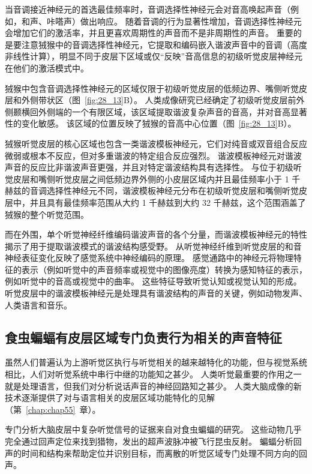 当音调接近神经元的首选最佳频率时，音调选择性神经元会对音高唤起声音（例如，和声、咔嗒声）做出响应。
随着音调的行为显著性增加，音调选择性神经元会增加它们的激活率，并且更喜欢周期性的声音而不是非周期性的声音。
重要的是要注意狨猴中的音调选择性神经元，它提取和编码嵌入谐波声音中的音调（高度非线性计算），明显不同于皮层下区域或仅“反映”音高信息的初级听觉皮层神经元在他们的激活模式中。


狨猴中包含音调选择性神经元的区域仅限于初级听觉皮层的低频边界、嘴侧听觉皮层和外侧带状区（图~\ref{fig:28_13}B）。
人类成像研究已经确定了初级听觉皮层前外侧颞横回外侧端的一个有限区域，该区域提取谐波复杂声音的音高，并对音高显著性的变化敏感。
该区域的位置反映了狨猴的音高中心位置（图~\ref{fig:28_13}B）。


狨猴听觉皮层的核心区域也包含一类谐波模板神经元，它们对纯音或双音组合反应微弱或根本不反应，但对多重谐波的特定组合反应强烈。
谐波模板神经元对谐波声音的反应比非谐波声音更强，并且对特定谐波结构具有选择性。
与位于初级听觉皮层和嘴侧听觉皮层之间低频边界外侧的小皮层区域内并且最佳频率小于 1 千赫兹的音调选择性神经元不同，谐波模板神经元分布在初级听觉皮层和嘴侧听觉皮层中，并且具有最佳频率范围从大约 1 千赫兹到大约 32 千赫兹，这个范围涵盖了狨猴的整个听觉范围。


而在外围，单个听觉神经纤维编码谐波声音的各个分量，而谐波模板神经元的特性揭示了用于提取谐波模式的谐波结构感受野。
从听觉神经纤维到听觉皮层的和音神经表征变化反映了感觉系统中神经编码的原理。
感觉通路中的神经元将物理特征的表示（例如听觉中的声音频率或视觉中的图像亮度）转换为感知特征的表示，例如听觉中的音高或视觉中的曲率。
这些特征导致听觉认知或视觉认知的形成。
听觉皮层中的谐波模板神经元是处理具有谐波结构的声音的关键，例如动物发声、人类语言和音乐。



\subsection{食虫蝙蝠有皮层区域专门负责行为相关的声音特征}

虽然人们普遍认为上游听觉区执行与听觉相关的越来越特化的功能，但与视觉系统相比，人们对听觉系统中串行中继的功能知之甚少。
人类听觉最重要的作用之一就是处理语言，但我们对分析说话声音的神经回路知之甚少。
人类大脑成像的新技术逐渐提供了对与语言相关的皮层区域功能特化的见解（第~\ref{chap:chap55}~章）。


专门分析大脑皮层中复杂听觉信号的证据来自对食虫蝙蝠的研究。
这些动物几乎完全通过回声定位来找到猎物，发出的超声波脉冲被飞行昆虫反射。
蝙蝠分析回声的时间和结构来帮助定位并识别目标，而离散的听觉区域专门处理不同方向的回声。



